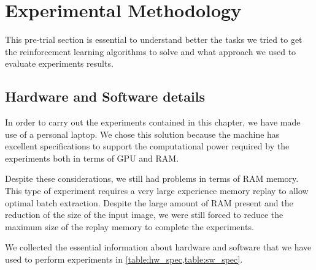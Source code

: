 \section{Experimental Methodology}

This pre-trial section is essential to understand better the tasks we tried to get the reinforcement learning algorithms to solve and what approach we used to evaluate experiments results.

\subsection{Hardware and Software details}

In order to carry out the experiments contained in this chapter, we have made use of a personal laptop.
We chose this solution because the machine has excellent specifications to support the computational power required by the experiments both in terms of GPU and RAM.

Despite these considerations, we still had problems in terms of RAM memory. This type of experiment requires a very large experience memory replay to allow optimal batch extraction. Despite the large amount of RAM present and the reduction of the size of the input image, we were still forced to reduce the maximum size of the replay memory to complete the experiments.

We collected the essential information about hardware and software that we have used to perform experiments in \vref{table:hw_spec,table:sw_spec}.

